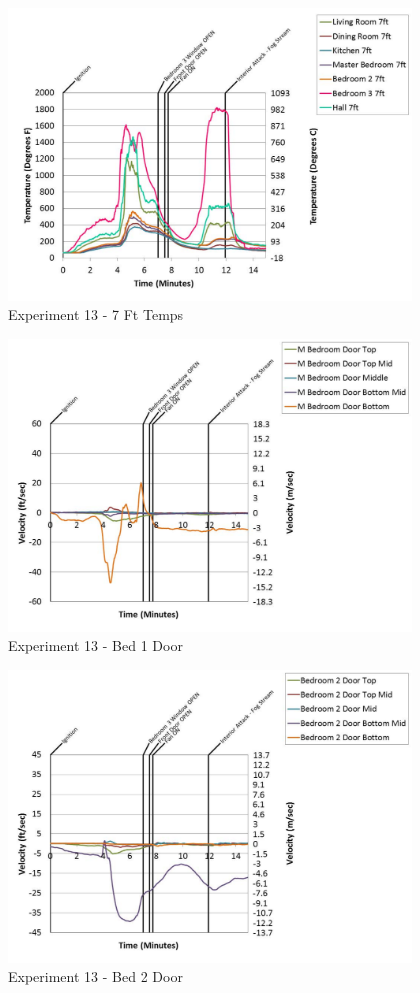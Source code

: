 \documentclass{article}
\begin{document}
\begin{appendices}
	\begin{figure}[h!]
		\centering
		\includegraphics[height=3.05in]{0_Images/Results_Charts/Exp_13_Charts/7FtTemps.pdf}
		\caption{Experiment 13 - 7 Ft Temps}
	\end{figure}
 
	\clearpage

	\begin{figure}[h!]
		\centering
		\includegraphics[height=3.05in]{0_Images/Results_Charts/Exp_13_Charts/Bed1Door.pdf}
		\caption{Experiment 13 - Bed 1 Door}
	\end{figure}
 

	\begin{figure}[h!]
		\centering
		\includegraphics[height=3.05in]{0_Images/Results_Charts/Exp_13_Charts/Bed2Door.pdf}
		\caption{Experiment 13 - Bed 2 Door}
	\end{figure}
 

\end{appendices}
\end{document}
